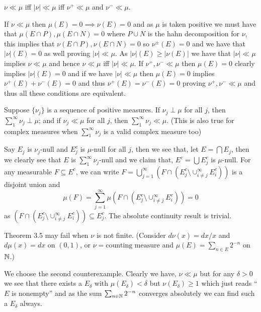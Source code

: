 \documentclass[12pt,a4paper]{article}
\begin{document}
\begin{problem}\label{prob:3-8}
$\nu\ll\mu$ iff $|\nu|\ll\mu$ iff $\nu^{+}\ll\mu$ and $\nu^{-}\ll\mu$.
\end{problem}
\begin{solution}
If $\nu\ll\mu$ then $\mu(E)=0\implies\nu(E)=0$ and as $\mu$ is taken positive we must have that $\mu(E\cap P),\mu(E\cap N)=0$ where $P\cup N$ is the hahn decomposition for $\nu$, this implies that $\nu(E\cap P),\nu(E\cap N)=0$ so $\nu^\pm(E)=0$ and we have that $|\nu|(E)=0$ as well proving $|\nu|\ll\mu$. 
As $|\nu|(E)\geq|\nu(E)|$ we have that $|\nu|\ll\mu$ implies $\nu\ll\mu$ and hence $\nu\ll\mu$ iff $|\nu|\ll\mu$. 
If $\nu^+,\nu^-\ll\mu$ then $\mu(E)=0$ clearly implies $|\nu|(E)=0$ and if we have $|\nu|\ll\mu$ then $\mu(E)=0$ implies $\nu^+(E)+\nu^-(E)=0$ and thus $\nu^+(E)=\nu^-(E)=0$ proving $\nu^+,\nu^-\ll\mu$ and thus all these conditions are equivalent.
\end{solution}
\begin{problem}\label{prob:3-9}
Suppose $\{\nu_{j}\}$ is a sequence of positive measures. If $\nu_{j}\perp\mu$ for all $j$, then $\sum_{1}^{\infty}\nu_{j}\perp\mu$; and if $\nu_{j}\ll\mu$ for all $j$, then $\sum_{1}^{\infty}\nu_{j}\ll\mu$. (This is also true for complex measures when $\sum_1^\infty\nu_j$ is a valid complex measure too)
\end{problem}
\begin{solution}
Say $E_j$ is $\nu_j$-null and $E_j^c$ is $\mu$-null for all $j$, then we see that, let $E=\bigcap E_j$, then we clearly see that $E$ is $\sum_1^\infty\nu_j$-null and we claim that, $E^c=\bigcup E_j^c$ is $\mu$-null. 
For any measurable $F\subseteq E^c$, we can write $F=\bigcup_{j=1}^\infty(F\cap(E_j^c\setminus\cup_{i\neq j}^\infty E_i^c))$ is a disjoint union and 
\[
    \mu(F)= \sum_{j=1}^{\infty}\mu(F\cap(E_j^c\setminus\cup_{i\neq j}^\infty E_i^c))=0
\]
as $(F\cap(E_j^c\setminus\cup_{i\neq j}^\infty E_i^c)) \subseteq E_j^c$. 
The absolute continuity result is trivial. 
\end{solution}
\begin{problem}\label{prob:3-10}
Theorem 3.5 may fail when $\nu$ is not finite. (Consider $d\nu(x)=dx/x$ and $d\mu(x)=dx$ on $(0, 1)$, or $\nu = \text{counting measure}$ and $\mu(E)=\sum_{n\in E}2^{-n}$ on $\mathbb{N}$.)
\end{problem}
\begin{solution}
We choose the second counterexample. 
Clearly we have, $\nu\ll\mu$ but for any $\delta>0$ we see that there exists a $E_\delta$ with $\mu(E_\delta)<\delta$ but $\nu(E_\delta)\geq 1$ which just reads ``$E$ is nonempty'' and as the sum $\sum_{n\in\mathbb{N}}2^{-n}$ converges absolutely we can find such a $E_\delta$ always.
\end{solution}
\end{document}
